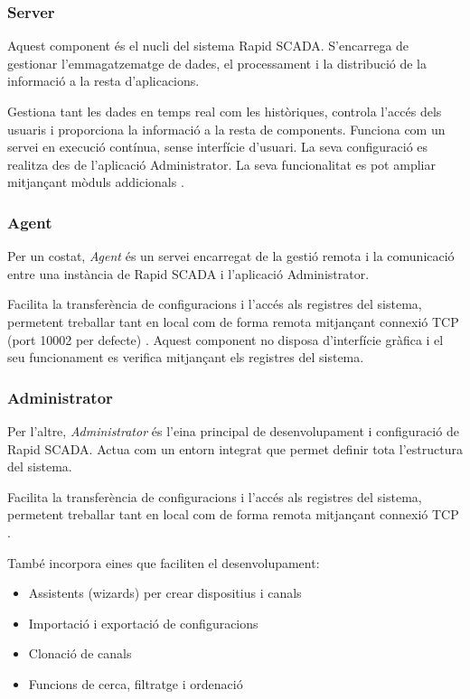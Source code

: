 \documentclass[12pt,a4paper]{report}
\begin{document}
\subsubsection{Server}

Aquest component és el nucli del sistema Rapid SCADA. S'encarrega de gestionar l'emmagatzematge de dades, el processament i la distribució de la informació a la resta d'aplicacions.

Gestiona tant les dades en temps real com les històriques, controla l'accés dels usuaris i proporciona la informació a la resta de components. Funciona com un servei en execució contínua, sense interfície d'usuari. La seva configuració es realitza des de l'aplicació Administrator. La seva funcionalitat es pot ampliar mitjançant mòduls addicionals \cite{rapidscada_applications}.


\subsubsection{Agent}

Per un costat, \textit{Agent} és un servei encarregat de la gestió remota i la comunicació entre una instància de Rapid SCADA i l'aplicació Administrator.

Facilita la transferència de configuracions i l'accés als registres del sistema, permetent treballar tant en local com de forma remota mitjançant connexió TCP (port 10002 per defecte) \cite{rapidscada_applications}. Aquest component no disposa d'interfície gràfica i el seu funcionament es verifica mitjançant els registres del sistema.

\subsubsection{Administrator}

Per l'altre, \textit{Administrator} és l'eina principal de desenvolupament i configuració de Rapid SCADA. Actua com un entorn integrat que permet definir tota l'estructura del sistema.

Facilita la transferència de configuracions i l'accés als registres del sistema, permetent treballar tant en local com de forma remota mitjançant connexió TCP \cite{rapidscada_applications}.


També incorpora eines que faciliten el desenvolupament:
\begin{itemize}
    \item Assistents (wizards) per crear dispositius i canals
    \item Importació i exportació de configuracions
    \item Clonació de canals
    \item Funcions de cerca, filtratge i ordenació
\end{itemize}
\end{document}
